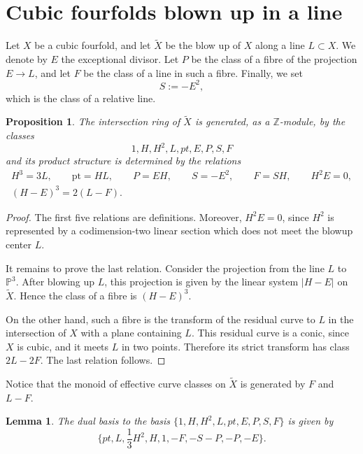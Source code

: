 \documentclass[11pt]{amsart}
\theoremstyle{plain}
\newtheorem{proposition}[theorem]{Proposition}
\newtheorem{lemma}[theorem]{Lemma}
\numberwithin{equation}{section}
\theoremstyle{definition}
\theoremstyle{remark}
\newcommand{\Z}{\mathbb Z}
\renewcommand{\P}{\mathbb P}
\begin{document}
\section{Cubic fourfolds blown up in a line}\label{sLine}

Let $X$ be a cubic fourfold, and let $\widetilde{X}$ be the blow up of $X$
along a line $L \subset X$. We denote by $E$ the exceptional divisor. Let
$P$ be the class of a fibre of the projection $E \to L$, and let $F$ be the
class of a line in such a fibre. Finally, we set
\[
S := -E^2,
\]
which is the class of a relative line.

\begin{proposition}\label{pIntersectionRing}
The intersection ring of $\widetilde{X}$ is generated, as a $\Z$-module,
by the classes
\[
    1,H,H^2,L,pt,E,P,S,F
\]
and its product structure is determined by the relations
\begin{gather*}
    H^3 = 3L, \qquad
    \mathrm{pt} = H L, \qquad
    P = E H, \qquad
    S = -E^2, \qquad
    F = S H, \qquad
    H^2E = 0, \\
    (H-E)^3 = 2(L-F).
\end{gather*}
\end{proposition}


\begin{proof}
The first five relations are definitions. Moreover, $H^2E=0$, since $H^2$
is represented by a codimension-two linear section which does not meet the
blowup center $L$.

It remains to prove the last relation. Consider the projection from the line
$L$ to $\P^3$. After blowing up $L$, this projection is given by the
linear system $|H-E|$ on $\widetilde{X}$. Hence the class of a fibre is $(H-E)^3$.

On the other hand, such a fibre is the transform of the residual curve to
$L$ in the intersection of $X$ with a plane containing $L$. This residual
curve is a conic, since $X$ is cubic, and it meets $L$ in two points.
Therefore its strict transform has class $2L - 2F$. The last relation follows. 
\end{proof}

Notice that the monoid of effective curve classes on $\widetilde{X}$ is generated by $F$ and $L-F$. 

\begin{lemma}\label{lDualBasis}
The dual basis to the basis  $\{1,H,H^2,L,pt,E,P,S,F\}$ is given by
\[
\{ pt,L,\frac{1}{3}H^2,H,1,-F,-S-P,-P,-E\}. 
\]
\end{lemma}
\end{document}
